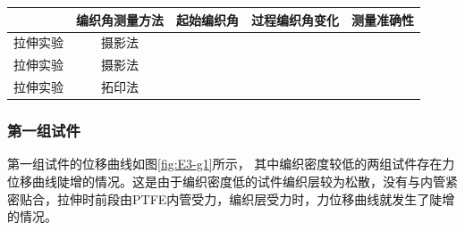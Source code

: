 \begin{table}[!htb]
	\centering
	\label{tab:hose-specimen-II-2}
	\begin{tabular}{@{\extracolsep{\fill}}>{\hspace{0.5cm}}ccccc}
		\toprule
		& 编织角测量方法 &   起始编织角    &  过程编织角变化   &   测量准确性    \\ \midrule
		拉伸实验 &   摄影法   & \checkmark &            &  \\
		拉伸实验 &   摄影法   & \checkmark &            &  \\
		拉伸实验 &   拓印法   & \checkmark & \checkmark & \checkmark \\ \bottomrule
	\end{tabular} 
\end{table}

\newpage

\subsubsection{第一组试件}

第一组试件的位移曲线如图\ref{fig:E3-g1}所示， 其中编织密度较低的两组试件存在力位移曲线陡增的情况。这是由于编织密度低的试件编织层较为松散，没有与内管紧密贴合，拉伸时前段由PTFE内管受力，编织层受力时，力位移曲线就发生了陡增的情况。

